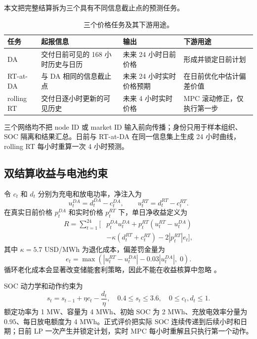 \documentclass[UTF8,a4paper,11pt,fontset=fandol]{ctexart}
\begin{document}
本文把完整结算拆为三个具有不同信息截止点的预测任务。
\begin{table}[H]
\centering
\caption{三个价格任务及其下游用途。}
\label{tab:tasks}
\small
\begin{tabularx}{\textwidth}{l Y Y Y}
\toprule
任务 & 起报信息 & 输出 & 下游用途 \\
\midrule
DA & 交付日前可见的 168 小时历史与日历 & 未来 24 小时日前价格 & 形成并锁定日前计划 \\
RT-at-DA & 与 DA 相同的信息截止点 & 未来 24 小时实时价格预期 & 在日前优化中估计偏差价值 \\
rolling RT & 交付日逐小时更新的可见历史 & 未来 4 小时实时价格 & MPC 滚动修正，仅执行第一步 \\
\bottomrule
\end{tabularx}
\end{table}

三个网络均不把 node ID 或 market ID 输入前向传播；身份只用于样本组织、SOC 隔离和结果汇总。日前与 RT-at-DA 在同一信息集上生成 24 小时曲线，rolling RT 每小时重算一次 4 小时预测。

\subsection{双结算收益与电池约束}

令 $c_t$ 和 $d_t$ 分别为充电和放电功率，净注入为
\begin{equation}
u_t^{DA}=d_t^{DA}-c_t^{DA},
\qquad
u_t^{RT}=d_t^{RT}-c_t^{RT}.
\end{equation}
在真实日前价格 $p_t^{DA}$ 和实时价格 $p_t^{RT}$ 下，单日净收益定义为
\begin{equation}
\begin{aligned}
R
=\sum_{t=1}^{24}\Big[
&p_t^{DA}u_t^{DA}
+p_t^{RT}\!\left(u_t^{RT}-u_t^{DA}\right)\\
&-\kappa\left(d_t^{RT}+c_t^{RT}\right)
-2|p_t^{RT}|e_t
\Big],
\end{aligned}
\label{eq:revenue}
\end{equation}
其中 $\kappa=5.7$ USD/MWh 为退化成本，偏差罚金量为
\begin{equation}
e_t=
\max\!\left(
\left|u_t^{RT}-u_t^{DA}\right|-0.03|u_t^{DA}|,\;0
\right).
\end{equation}
循环老化成本会显著改变储能套利策略，因此不能在收益核算中忽略
\cite{xu2018}。

SOC 动力学和动作约束为
\begin{equation}
s_t=s_{t-1}+\eta c_t-\frac{d_t}{\eta},
\quad
0.4\le s_t\le 3.6,
\quad
0\le c_t,d_t\le 1.
\label{eq:soc}
\end{equation}
额定功率为 1 MW、容量为 4 MWh、初始 SOC 为 2 MWh、充放电效率分量为 $0.95$、每日放电额度为 4 MWh。正式评价把实际 SOC 连续传递到后续小时和日期；日前 LP 一次产生并锁定计划，实时 MPC 每小时重解且只执行第一个动作。
\end{document}
